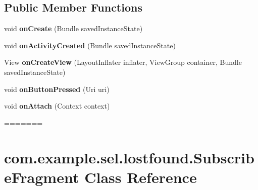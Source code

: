 \subsection*{Public Member Functions}
\begin{DoxyCompactItemize}
\item 
\hypertarget{classcom_1_1example_1_1sel_1_1lostfound_1_1SubscribeFragment_a7f0cd7584a12208f6cc9e3c8fb1fd680}{void {\bfseries on\-Create} (Bundle saved\-Instance\-State)}\label{classcom_1_1example_1_1sel_1_1lostfound_1_1SubscribeFragment_a7f0cd7584a12208f6cc9e3c8fb1fd680}

\item 
\hypertarget{classcom_1_1example_1_1sel_1_1lostfound_1_1SubscribeFragment_a6daae3059443ffda76c69cc51f2d9dec}{void {\bfseries on\-Activity\-Created} (Bundle saved\-Instance\-State)}\label{classcom_1_1example_1_1sel_1_1lostfound_1_1SubscribeFragment_a6daae3059443ffda76c69cc51f2d9dec}

\item 
\hypertarget{classcom_1_1example_1_1sel_1_1lostfound_1_1SubscribeFragment_a521224b1fa6e19b441cd064c636137f1}{View {\bfseries on\-Create\-View} (Layout\-Inflater inflater, View\-Group container, Bundle saved\-Instance\-State)}\label{classcom_1_1example_1_1sel_1_1lostfound_1_1SubscribeFragment_a521224b1fa6e19b441cd064c636137f1}

\item 
\hypertarget{classcom_1_1example_1_1sel_1_1lostfound_1_1SubscribeFragment_a018589e8d66394f7c11ec44d996fbdcf}{void {\bfseries on\-Button\-Pressed} (Uri uri)}\label{classcom_1_1example_1_1sel_1_1lostfound_1_1SubscribeFragment_a018589e8d66394f7c11ec44d996fbdcf}

\item 
\hypertarget{classcom_1_1example_1_1sel_1_1lostfound_1_1SubscribeFragment_adc31ba19040d95af6b9ab1a11677f93d}{void {\bfseries on\-Attach} (Context context)}\label{classcom_1_1example_1_1sel_1_1lostfound_1_1SubscribeFragment_adc31ba19040d95af6b9ab1a11677f93d}
=======
\hypertarget{classcom_1_1example_1_1sel_1_1lostfound_1_1SubscribeFragment}{\section{com.\-example.\-sel.\-lostfound.\-Subscribe\-Fragment \-Class \-Reference}
\label{classcom_1_1example_1_1sel_1_1lostfound_1_1SubscribeFragment}
}



\end{DoxyCompactItemize}
